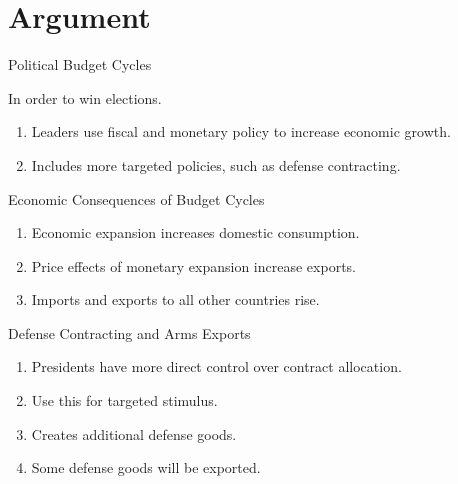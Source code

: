 \documentclass[12pt]{beamer}
\begin{document}

\section{Argument} 


\begin{frame}{Political Budget Cycles}

In order to win elections. 
\pause 
\begin{enumerate} 
\item Leaders use fiscal and monetary policy to increase economic growth. 
\pause 
\item Includes more targeted policies, such as defense contracting.
\end{enumerate}


\end{frame} 


\begin{frame}{Economic Consequences of Budget Cycles}

\pause 
\begin{enumerate} 
\item Economic expansion increases domestic consumption.  
\pause 
\item Price effects of monetary expansion increase exports.
\pause
\item Imports and exports to all other countries rise. 
\end{enumerate}


\end{frame} 


\begin{frame}{Defense Contracting and Arms Exports}

\pause 
\begin{enumerate} 
\item Presidents have more direct control over contract allocation.  
\pause 
\item Use this for targeted stimulus. 
\pause
\item Creates additional defense goods.
\pause
\item Some defense goods will be exported.
\end{enumerate}


\end{frame} 
\end{document}
